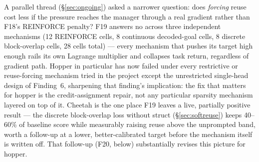 \documentclass[10pt]{article}
\begin{document}
A parallel thread (\S\ref{sec:ongoing}) asked a narrower question: does
\emph{forcing} reuse cost less if the pressure reaches the manager through a
real gradient rather than F18's REINFORCE penalty? F19 answers no across
three independent mechanisms (12 REINFORCE cells, 8 continuous decoded-goal
cells, 8 discrete block-overlap cells, 28 cells total) --- every mechanism
that pushes its target high enough rails its own Lagrange multiplier and
collapses task return, regardless of gradient path. Hopper in particular has
now failed under every restrictive or reuse-forcing mechanism tried in the
project except the unrestricted single-head design of Finding~6, sharpening
that finding's implication: the fix that matters for hopper is the
credit-assignment repair, not any particular sparsity mechanism layered on
top of it. Cheetah is the one place F19 leaves a live, partially positive
result --- the discrete block-overlap loss without struct
(\S\ref{sec:softreuse}) keeps 40--60\% of baseline score while measurably
raising reuse above the unprompted band, worth a follow-up at a lower,
better-calibrated target before the mechanism itself is written off. That
follow-up (F20, below) substantially revises this picture for hopper.
\end{document}
